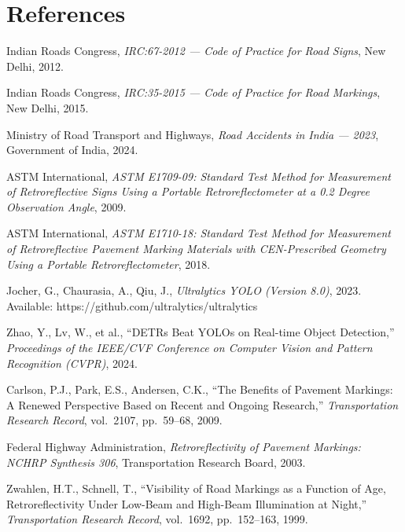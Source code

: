 \documentclass[11pt,a4paper]{article}
\begin{document}

\newpage
\section*{References}

\begin{enumerate}[label={[\arabic*]}, noitemsep, leftmargin=*]
    \item Indian Roads Congress, \textit{IRC:67-2012 --- Code of Practice for Road Signs}, New Delhi, 2012.
    \item Indian Roads Congress, \textit{IRC:35-2015 --- Code of Practice for Road Markings}, New Delhi, 2015.
    \item Ministry of Road Transport and Highways, \textit{Road Accidents in India --- 2023}, Government of India, 2024.
    \item ASTM International, \textit{ASTM E1709-09: Standard Test Method for Measurement of Retroreflective Signs Using a Portable Retroreflectometer at a 0.2 Degree Observation Angle}, 2009.
    \item ASTM International, \textit{ASTM E1710-18: Standard Test Method for Measurement of Retroreflective Pavement Marking Materials with CEN-Prescribed Geometry Using a Portable Retroreflectometer}, 2018.
    \item Jocher, G., Chaurasia, A., Qiu, J., \textit{Ultralytics YOLO (Version 8.0)}, 2023. Available: https://github.com/ultralytics/ultralytics
    \item Zhao, Y., Lv, W., et al., ``DETRs Beat YOLOs on Real-time Object Detection,'' \textit{Proceedings of the IEEE/CVF Conference on Computer Vision and Pattern Recognition (CVPR)}, 2024.
    \item Carlson, P.J., Park, E.S., Andersen, C.K., ``The Benefits of Pavement Markings: A Renewed Perspective Based on Recent and Ongoing Research,'' \textit{Transportation Research Record}, vol.~2107, pp.~59--68, 2009.
    \item Federal Highway Administration, \textit{Retroreflectivity of Pavement Markings: NCHRP Synthesis 306}, Transportation Research Board, 2003.
    \item Zwahlen, H.T., Schnell, T., ``Visibility of Road Markings as a Function of Age, Retroreflectivity Under Low-Beam and High-Beam Illumination at Night,'' \textit{Transportation Research Record}, vol.~1692, pp.~152--163, 1999.

\end{enumerate}
\end{document}
